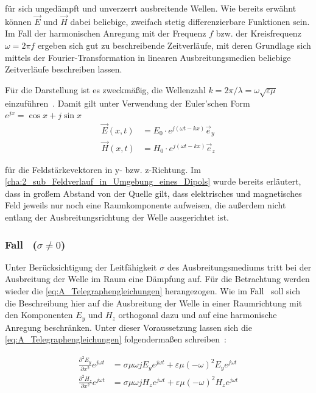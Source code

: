 für sich ungedämpft und unverzerrt ausbreitende Wellen. Wie bereits erwähnt können $\vec E$ und $\vec H$ dabei beliebige, zweifach stetig differenzierbare Funktionen sein. Im Fall der harmonischen Anregung mit der Frequenz $f$ bzw. der Kreisfrequenz $\omega = 2\pi f$ ergeben sich gut zu beschreibende Zeitverläufe, mit deren Grundlage sich mittels der Fourier-Transformation in linearen Ausbreitungsmedien beliebige Zeitverläufe beschreiben lassen. \par
Für die Darstellung ist es zweckmäßig, die Wellenzahl $k = 2\pi / \lambda = \omega \sqrt{\varepsilon \mu}$ einzuführen~\cite{EM_Schirmung}. Damit gilt unter Verwendung der Euler'schen Form $e^{jx} = \cos{x} + j \sin{x}$~\cite{Merzinger}
\begin{subequations}
    \begin{align}
        \vec E(x,t) &= E_0 \cdot e^{j (\omega t - k x)} \vec e_y \\
        \vec H(x,t) &= H_0 \cdot e^{j (\omega t - k x)} \vec e_z
    \end{align}
    \label{eq:A_Wellengleichungen}
\end{subequations}

für die Feldstärkevektoren in y- bzw. z-Richtung. Im \Abschnitt \ref{cha:2_sub_Feldverlauf_in_Umgebung_eines_Dipols} wurde bereits erläutert, dass in großem Abstand von der Quelle gilt, dass elektrisches und magnetisches Feld jeweils nur noch eine Raumkomponente aufweisen, die außerdem nicht entlang der Ausbreitungsrichtung der Welle ausgerichtet ist.


\subsubsection{Fall~ ($\sigma \neq 0$)}

Unter Berücksichtigung der Leitfähigkeit $\sigma$ des Ausbreitungsmediums tritt bei der Ausbreitung der Welle im Raum eine Dämpfung auf. Für die Betrachtung werden wieder die \Gleichungen \eqref{eq:A_Telegraphengleichungen} herangezogen. Wie im Fall~ soll sich die Beschreibung hier auf die Ausbreitung der Welle in einer Raumrichtung mit den Komponenten $E_y$ und $H_z$ orthogonal dazu und auf eine harmonische Anregung beschränken. Unter dieser Voraussetzung lassen sich die \Gleichungen \eqref{eq:A_Telegraphengleichungen} folgendermaßen schreiben~\cite{EM_Schirmung}:

\begin{subequations}
    \begin{align}
        \frac{\partial^2 E_y}{\partial x^2} e^{j\omega t} &= \sigma \mu \omega j E_y e^{j \omega t} + \varepsilon \mu (- \omega)^2 E_y e^{j \omega t} \\
        \frac{\partial^2 H_z}{\partial x^2} e^{j\omega t} &= \sigma \mu \omega j H_z e^{j \omega t} + \varepsilon \mu (- \omega)^2 H_z e^{j \omega t}
    \end{align}
\end{subequations}

